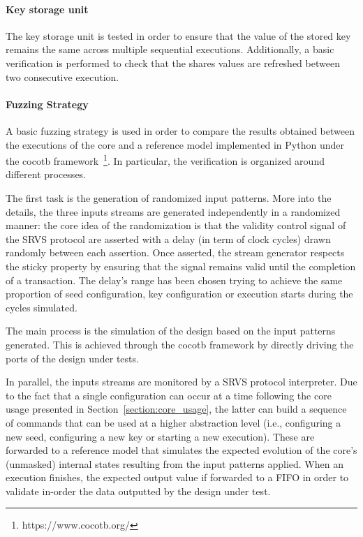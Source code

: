 \documentclass{scrartcl}
\begin{document}
\paragraph{Key storage unit}The key storage unit is tested in order to
ensure that the value of the stored key remains the same across multiple
sequential executions. Additionally, a basic verification is performed to check
that the shares values are refreshed between two consecutive execution. 

\paragraph{Fuzzing Strategy}A basic fuzzing strategy is used in order to compare the results
obtained between the executions of the core and a reference model implemented in
Python under the cocotb framework~\footnote{https://www.cocotb.org/}.
In particular, the verification is organized around different processes.  

The first task is the generation of randomized input patterns. More into the
details, the three inputs streams are generated independently in a randomized
manner: the core idea of the randomization is that the validity control signal
of the SRVS protocol are asserted with a delay (in term of clock cycles) drawn
randomly between each assertion. Once asserted, the stream generator respects
the sticky property by ensuring that the signal remains valid until the
completion of a transaction. The delay's range has been chosen trying to
achieve the same proportion of seed configuration, key configuration or
execution starts during the cycles simulated. 

The main process is the simulation of the design based on the input patterns
generated. This is achieved through the cocotb framework by directly driving
the ports of the design under tests. 

In parallel, the inputs streams are monitored by a SRVS protocol interpreter.
Due to the fact that a single configuration can occur at a time following the
core usage presented in Section~\ref{section:core_usage}, the latter can build a
sequence of commands that can be used at a higher abstraction level (i.e., configuring a new
seed, configuring a new key or starting a new execution). These are
forwarded to a reference model that simulates the expected evolution of the
core's (unmasked) internal states resulting from the input patterns applied. When
an execution finishes, the expected output value if forwarded to a FIFO in
order to validate in-order the data outputted by the design under test.
\end{document}
